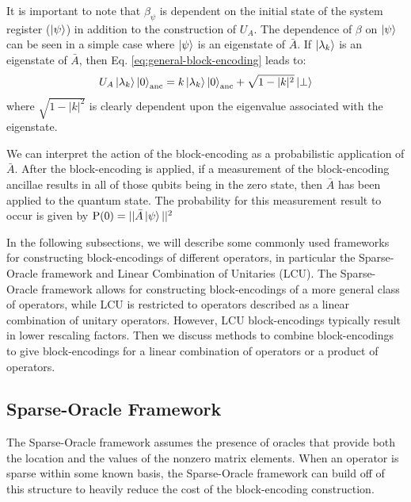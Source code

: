 It is important to note that $\beta_\psi$ is dependent on the initial state of the system register ($\ket{\psi}$) in addition to the construction of $U_A$.
The dependence of $\beta$ on $\ket{\psi}$ can be seen in a simple case where $\ket{\psi}$ is an eigenstate of $\bar{A}$.
If $\ket{\lambda_k}$ is an eigenstate of $\bar{A}$, then Eq. \ref{eq:general-block-encoding} leads to:
\begin{equation}
    U_A \ket{\lambda_k} \ket{0}_{\text{anc}} = k \ket{\lambda_k} \ket{0}_{\text{anc}} + \sqrt{1 - |k|^2} \ket{\perp}
\end{equation}
where $\sqrt{1 - |k|^2}$ is clearly dependent upon the eigenvalue associated with the eigenstate.

We can interpret the action of the block-encoding as a probabilistic application of $\bar{A}$.
After the block-encoding is applied, if a measurement of the block-encoding ancillae results in all of those qubits being in the zero state, then $\bar{A}$ has been applied to the quantum state.
The probability for this measurement result to occur is given by $\text{P}(0) = ||\bar{A} \ket{\psi}||^2$

In the following subsections, we will describe some commonly used frameworks for constructing block-encodings of different operators, in particular the Sparse-Oracle framework and Linear Combination of Unitaries (LCU).
The Sparse-Oracle framework allows for constructing block-encodings of a more general class of operators, while LCU is restricted to operators described as a linear combination of unitary operators.
However, LCU block-encodings typically result in lower rescaling factors. 
Then we discuss methods to combine block-encodings to give block-encodings for a linear combination of operators or a product of operators.

\subsection{Sparse-Oracle Framework}
\label{subsec:sparse-be}

The Sparse-Oracle framework \cite{berry2009black, childs2009universal, berry2015hamiltonian,berry2015simulating, low2017optimal,childs2017quantum,gilyen2019quantum} assumes the presence of oracles that provide both the location and the values of the nonzero matrix elements.
When an operator is sparse within some known basis, the Sparse-Oracle framework can build off of this structure to heavily reduce the cost of the block-encoding construction.

